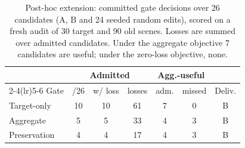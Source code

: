 \begin{table}[t]
\centering
\small
\setlength{\tabcolsep}{3.0pt}
\begin{tabular}{lcccccc}
\toprule
 & \multicolumn{3}{c}{Admitted} & \multicolumn{2}{c}{Agg.-useful} & \\
\cmidrule(lr){2-4}\cmidrule(lr){5-6}
Gate & /26 & w/ loss & losses & adm. & missed & Deliv. \\
\midrule
Target-only & 10 & 10 & 61 & 7 & 0 & B \\
Aggregate & 5 & 5 & 33 & 4 & 3 & B \\
Preservation & 4 & 4 & 17 & 4 & 3 & B \\
\bottomrule
\end{tabular}
\caption{Post-hoc extension: committed gate decisions over 26 candidates (A, B and 24 seeded random edits), scored on a fresh audit of 30 target and 90 old scenes. Losses are summed over admitted candidates. Under the aggregate objective 7 candidates are useful; under the zero-loss objective, none.}
\label{tab:population}
\end{table}
